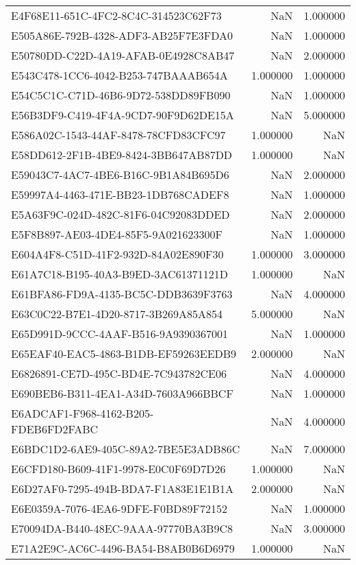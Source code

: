 \begin{tabular}{lrr}
E4F68E11-651C-4FC2-8C4C-314523C62F73 & NaN & 1.000000 \\
E505A86E-792B-4328-ADF3-AB25F7E3FDA0 & NaN & 1.000000 \\
E50780DD-C22D-4A19-AFAB-0E4928C8AB47 & NaN & 2.000000 \\
E543C478-1CC6-4042-B253-747BAAAB654A & 1.000000 & 1.000000 \\
E54C5C1C-C71D-46B6-9D72-538DD89FB090 & NaN & 1.000000 \\
E56B3DF9-C419-4F4A-9CD7-90F9D62DE15A & NaN & 5.000000 \\
E586A02C-1543-44AF-8478-78CFD83CFC97 & 1.000000 & NaN \\
E58DD612-2F1B-4BE9-8424-3BB647AB87DD & 1.000000 & NaN \\
E59043C7-4AC7-4BE6-B16C-9B1A84B695D6 & NaN & 2.000000 \\
E59997A4-4463-471E-BB23-1DB768CADEF8 & NaN & 1.000000 \\
E5A63F9C-024D-482C-81F6-04C92083DDED & NaN & 2.000000 \\
E5F8B897-AE03-4DE4-85F5-9A021623300F & NaN & 1.000000 \\
E604A4F8-C51D-41F2-932D-84A02E890F30 & 1.000000 & 3.000000 \\
E61A7C18-B195-40A3-B9ED-3AC61371121D & 1.000000 & NaN \\
E61BFA86-FD9A-4135-BC5C-DDB3639F3763 & NaN & 4.000000 \\
E63C0C22-B7E1-4D20-8717-3B269A85A854 & 5.000000 & NaN \\
E65D991D-9CCC-4AAF-B516-9A9390367001 & NaN & 1.000000 \\
E65EAF40-EAC5-4863-B1DB-EF59263EEDB9 & 2.000000 & NaN \\
E6826891-CE7D-495C-BD4E-7C943782CE06 & NaN & 4.000000 \\
E690BEB6-B311-4EA1-A34D-7603A966BBCF & NaN & 1.000000 \\
E6ADCAF1-F968-4162-B205-FDEB6FD2FABC & NaN & 4.000000 \\
E6BDC1D2-6AE9-405C-89A2-7BE5E3ADB86C & NaN & 7.000000 \\
E6CFD180-B609-41F1-9978-E0C0F69D7D26 & 1.000000 & NaN \\
E6D27AF0-7295-494B-BDA7-F1A83E1E1B1A & 2.000000 & NaN \\
E6E0359A-7076-4EA6-9DFE-F0BD89F72152 & NaN & 1.000000 \\
E70094DA-B440-48EC-9AAA-97770BA3B9C8 & NaN & 3.000000 \\
E71A2E9C-AC6C-4496-BA54-B8AB0B6D6979 & 1.000000 & NaN \\

\end{tabular}
